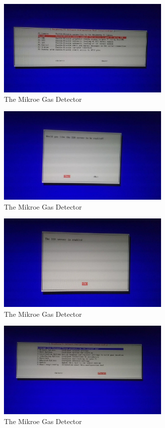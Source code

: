 \documentclass[11pt]{report}
\begin{document}
		\begin{figure}[ht]
			\centering
			\includegraphics[width=0.75\textwidth]{images/pi/ssh_2.jpg} 
			\caption{The Mikroe Gas Detector}
		\end{figure}

		\begin{figure}[ht]
			\centering
			\includegraphics[width=0.75\textwidth]{images/pi/ssh_3.jpg} 
			\caption{The Mikroe Gas Detector}
		\end{figure}

		\begin{figure}[ht]
			\centering
			\includegraphics[width=0.75\textwidth]{images/pi/ssh_4.jpg} 
			\caption{The Mikroe Gas Detector}
		\end{figure}

		\begin{figure}[ht]
			\centering
			\includegraphics[width=0.75\textwidth]{images/pi/ssh_5.jpg} 
			\caption{The Mikroe Gas Detector}
		\end{figure}
\end{document}
